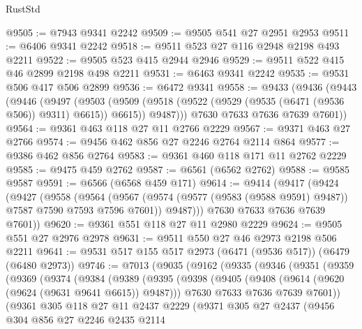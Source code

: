 \begin{lexlean}{RustStd}
\begin{coremodule}
{\begin{coremodule}
{{{{{{{{{{{{{{{{{{{{{{{{{{@9505 := @7943 @9341 @2242
@9509 := @9505 @541 @27 @2951 @2953
@9511 := @6406 @9341 @2242
@9518 := @9511 @523 @27 @116 @2948 @2198 @493 @2211
@9522 := @9505 @523 @415 @2944 @2946
@9529 := @9511 @522 @415 @46 @2899 @2198 @498 @2211
@9531 := @6463 @9341 @2242
@9535 := @9531 @506 @417 @506 @2899
@9536 := @6472 @9341
@9558 := @9433
    (@9436
      (@9443
        (@9446
          (@9497
            (@9503
              (@9509 (@9518 (@9522 (@9529 (@9535 (@6471 (@9536 @506)) @9311) @6615)) @6615))
              @9487)))
        @7630
        @7633
        @7636
        @7639
        @7601))
@9564 := @9361 @463 @118 @27 @11 @2766 @2229
@9567 := @9371 @463 @27 @2766
@9574 := @9456 @462 @856 @27 @2246 @2764 @2114 @864
@9577 := @9386 @462 @856 @2764
@9583 := @9361 @460 @118 @171 @11 @2762 @2229
@9585 := @9475 @459 @2762
@9587 := @6561 (@6562 @2762)
@9588 := @9585 @9587
@9591 := @6566 (@6568 @459 @171)
@9614 := @9414
    (@9417
      (@9424
        (@9427
          (@9558
            (@9564
              (@9567 (@9574 (@9577 (@9583 (@9588 @9591) @9487)) @7587 @7590 @7593 @7596 @7601))
              @9487)))
        @7630
        @7633
        @7636
        @7639
        @7601))
@9620 := @9361 @551 @118 @27 @11 @2980 @2229
@9624 := @9505 @551 @27 @2976 @2978
@9631 := @9511 @550 @27 @46 @2973 @2198 @506 @2211
@9641 := @9531 @517 @155 @517 @2973 (@6471 (@9536 @517)) (@6479 (@6480 @2973))
@9746 := @7013
    (@9035
      (@9162
        (@9335
          (@9346
            (@9351
              (@9359
                (@9369
                  (@9374
                    (@9384
                      (@9389
                        (@9395
                          (@9398
                            (@9405
                              (@9408 (@9614 (@9620 (@9624 (@9631 @9641 @6615)) @9487)))
                              @7630
                              @7633
                              @7636
                              @7639
                              @7601))
                          (@9361
                            @305
                            @118
                            @27
                            @11
                            @2437
                            @2229
                            (@9371
                              @305
                              @27
                              @2437
                              (@9456
                                @304
                                @856
                                @27
                                @2246
                                @2435
                                @2114
}}}}}}}}}}}}}}}}}}}}}}}}}}
\end{coremodule}}
\end{coremodule}
\end{lexlean}
